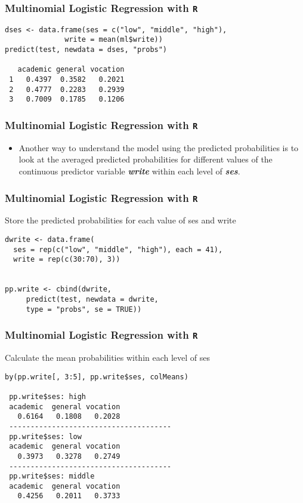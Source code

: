 \documentclass[00-GLMregslides.tex]{subfiles}
\begin{document}
\begin{frame}[fragile]

\frametitle{Multinomial Logistic Regression with \texttt{R}}
\Large
\begin{verbatim}
dses <- data.frame(ses = c("low", "middle", "high"), 
              write = mean(ml$write))
predict(test, newdata = dses, "probs")
 
   academic general vocation
 1   0.4397  0.3582   0.2021
 2   0.4777  0.2283   0.2939
 3   0.7009  0.1785   0.1206
\end{verbatim}
\end{frame}
\begin{frame}[fragile]

\frametitle{Multinomial Logistic Regression with \texttt{R}}
\Large
\begin{itemize}
\item Another way to understand the model using the predicted probabilities is to look at the averaged predicted probabilities for different values 
of the continuous predictor variable \textbf{\textit{write}} within each level of \textbf{\textit{ses}}.
\end{itemize}

 
\end{frame}
\begin{frame}[fragile]

\frametitle{Multinomial Logistic Regression with \texttt{R}}
\large
Store the predicted probabilities for each value of ses and write
\begin{verbatim}
dwrite <- data.frame(
  ses = rep(c("low", "middle", "high"), each = 41),
  write = rep(c(30:70), 3))


pp.write <- cbind(dwrite, 
     predict(test, newdata = dwrite, 
     type = "probs", se = TRUE))
\end{verbatim}
\end{frame}
\begin{frame}[fragile]

\frametitle{Multinomial Logistic Regression with \texttt{R}}
\large
 Calculate the mean probabilities within each level of ses
\begin{verbatim}
by(pp.write[, 3:5], pp.write$ses, colMeans)
 
 pp.write$ses: high
 academic  general vocation 
   0.6164   0.1808   0.2028 
 --------------------------------------
 pp.write$ses: low
 academic  general vocation 
   0.3973   0.3278   0.2749 
 --------------------------------------
 pp.write$ses: middle
 academic  general vocation 
   0.4256   0.2011   0.3733
\end{verbatim}
\end{frame}
\end{document}
